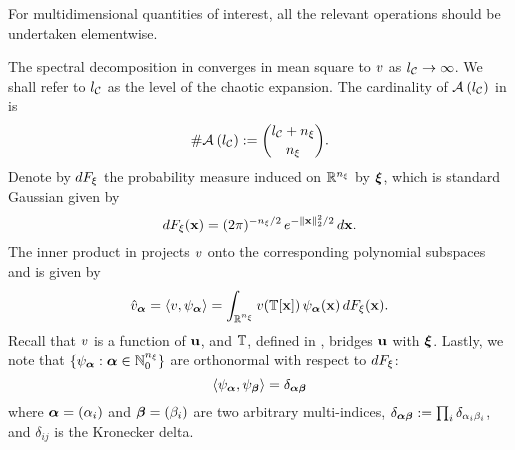\begin{remark} 
For multidimensional quantities of interest, all the relevant operations should be undertaken elementwise.
\end{remark}
The spectral decomposition in  converges in mean square to $\w$ as $\nclevel \to \infty$.
We shall refer to $\nclevel$ as the level of the chaotic expansion.
The cardinality of $\chaosMultiindexSet{\nclevel}$ in  is
\[
  \cardinality{\chaosMultiindexSet{\nclevel}} := { \nclevel + \nvars \choose \nvars }.
\]
Denote by $\d\distribution_\z$ the probability measure induced on $\real^\nvars$ by $\vz$, which is standard Gaussian given by
\begin{equation} \xelab{standard-gaussian-measure}
  \d\distribution_\z(\point) = (2 \pi)^{-\nvars/2} \, e^{-\norm[2]{\point}^2 / 2} \, \d\point.
\end{equation}
The inner product in  projects $\w$ onto the corresponding polynomial subspaces and is given by
\begin{equation} \xelab{orthogonal-projection}
  \coefficient{\w}_{\multiindex} = \innerProduct{\w, \polynomial_{\multiindex}} = \int_{\real^{\nvars}} \w(\transformation[\point]) \, \polynomial_{\multiindex}(\point) \, \d\distribution_\z(\point).
\end{equation}
Recall that $\w$ is a function of $\vu$, and $\transformation$, defined in , bridges $\vu$ with $\vz$.
Lastly, we note that $\{ \polynomial_{\multiindex}: \multiindex \in \natural^\nvars \}$ are orthonormal with respect to $\d\distribution_\z$:
\[
  \innerProduct{\polynomial_{\multiindex}, \polynomial_{\multiindex[\beta]}} = \delta_{\multiindex \multiindex[\beta]}
\]
where $\multiindex = (\alpha_i)$ and $\multiindex[\beta] = (\beta_i)$ are two arbitrary multi-indices, $\delta_{\multiindex \multiindex[\beta]} := \prod_i \delta_{\alpha_i \beta_i}$, and $\delta_{ij}$ is the Kronecker delta.
